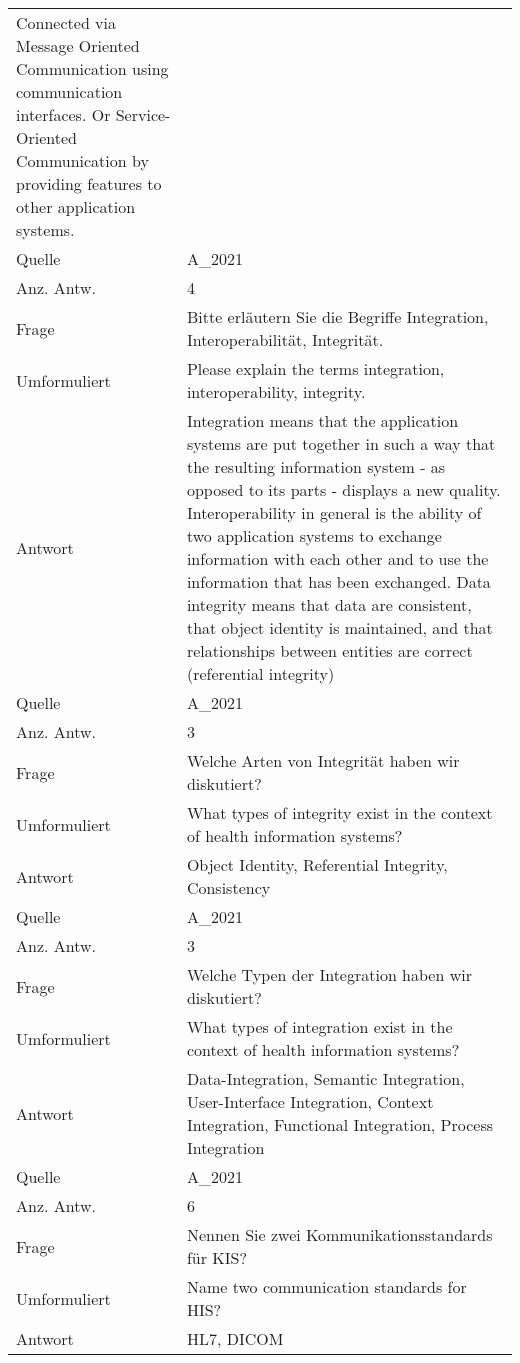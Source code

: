 \begin{landscape}
\begin{longtable}{p{3cm}p{}}
    Connected via Message Oriented Communication using communication interfaces.
    Or Service-Oriented Communication by providing features to other application systems.\\
    Quelle & A\_2021 \\
    Anz. Antw. & 4 \\
    \midrule
    Frage & Bitte erläutern Sie die Begriffe Integration, Interoperabilität, Integrität. \\
    Umformuliert & Please explain the terms integration, interoperability, integrity.\\
    Antwort & Integration means that the application systems are put together in such a way that the resulting information system - as opposed to its parts - displays a new quality.
    Interoperability in general is the ability of two application systems to exchange information with each other and to use the information that has been exchanged.
    Data integrity means that data are consistent, that object identity is maintained, and that relationships between entities are correct (referential integrity) \\
    Quelle & A\_2021 \\
    Anz. Antw. & 3 \\
    \midrule
    Frage & Welche Arten von Integrität haben wir diskutiert? \\
    Umformuliert & What types of integrity exist in the context of health information systems? \\
    Antwort & Object Identity, Referential Integrity, Consistency \\
    Quelle & A\_2021 \\
    Anz. Antw. & 3 \\
    \midrule
    Frage & Welche Typen der Integration haben wir diskutiert? \\
    Umformuliert & What types of integration exist in the context of health information systems? \\
    Antwort & Data-Integration, Semantic Integration, User-Interface Integration, Context Integration, Functional Integration, Process Integration \\
    Quelle & A\_2021 \\
    Anz. Antw. & 6 \\
    \midrule
    Frage & Nennen Sie zwei Kommunikationsstandards für KIS? \\
    Umformuliert & Name two communication standards for HIS? \\
    Antwort & HL7, DICOM \\

\end{longtable}
\end{landscape}
